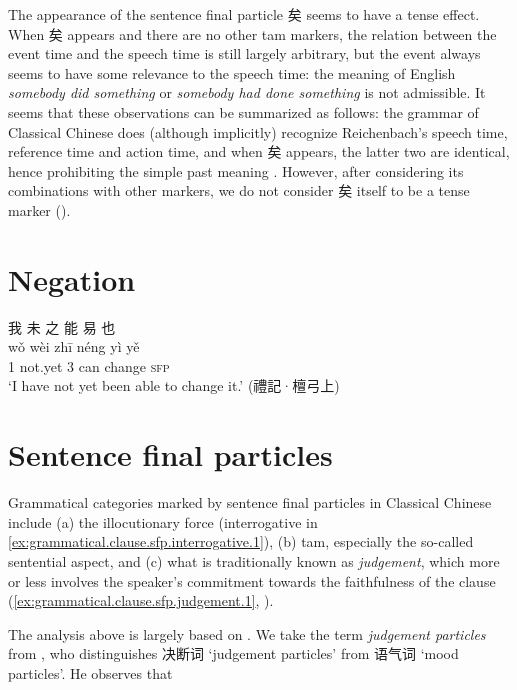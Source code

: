 \documentclass[UTF8, a4paper, oneside, scheme=plain, 12pt]{ctexrep}
\newcommand*{\citepage}[1]{p.~{#1}}
\newcommand*{\citepages}[1]{pp.~{#1}}
\newcommand*{\term}[1]{\emph{#1}}
\newcommand{\form}[1]{\emph{#1}}
\newcommand{\translate}[1]{`#1'}
\newcommand*{\category}[1]{\textsc{#1}}
\begin{document}
The appearance of the sentence final particle 矣 seems to have a tense effect.
When 矣 appears and there are no other \ac{tam} markers, the relation between the event time and the speech time is still largely arbitrary,
but the event always seems to have some relevance to the speech time:
the meaning of English \form{somebody did something} or \form{somebody had done something} is not admissible.
It seems that these observations can be summarized as follows:
the grammar of Classical Chinese does (although implicitly) recognize Reichenbach's speech time, reference time and action time,
and when 矣 appears, the latter two are identical, hence prohibiting the simple past meaning
 \citep[\citepages{437-446}]{meiguang2018}.
However, after considering its combinations with other markers, we do not consider 矣 itself to be a tense marker ().

\chapter{Negation}

\begin{exe}
        \ex
    \glll
    我 未 之 能 易 也 \\
    wǒ wèi zhī néng yì yě \\
    1 not.yet 3 can change \category{sfp} \\
    \glt\translate{I have not yet been able to change it.} \hfill{(禮記·檀弓上)}
\end{exe}

\chapter{Sentence final particles}


Grammatical categories marked by sentence final particles in Classical Chinese include (a) the illocutionary force (interrogative in \ref{ex:grammatical.clause.sfp.interrogative.1}),
(b) \ac{tam}, especially the so-called sentential aspect, and
(c) what is traditionally known as \emph{judgement}, which more or less involves the speaker's commitment towards the faithfulness of the clause (\ref{ex:grammatical.clause.sfp.judgement.1}, ).

The analysis above is largely based on \citet{li2004grammar}.
We take the term \term{judgement particles} from \citet[\citepage{220}]{li2004grammar},
who distinguishes 决断词 \translate{judgement particles}
from 语气词 \translate{mood particles}. 
He observes that 
\end{document}
